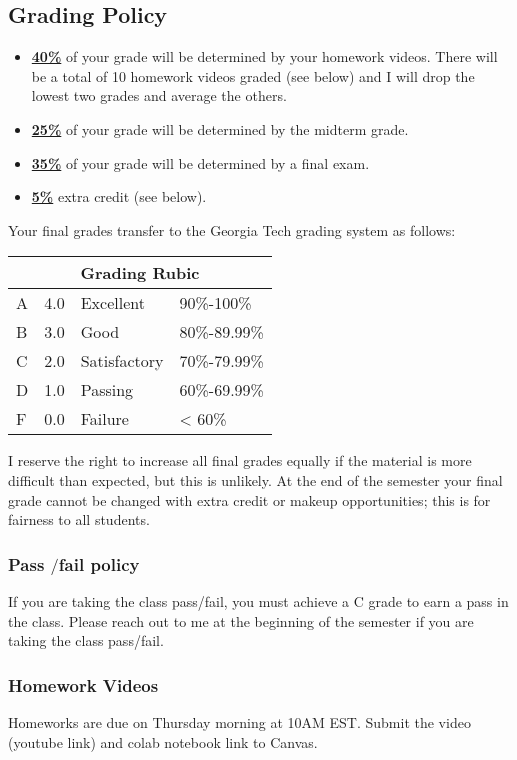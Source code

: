 \documentclass[11pt]{article}
\begin{document}
\subsection*{Grading Policy}
\begin{itemize}
\item \underline{\textbf{40\%}} of your grade will be determined by your homework videos. There will be a total of 10 homework videos graded (see below) and I will drop the lowest two grades and average the others. 
\item \underline{\textbf{25\%}} of your grade will be determined by the midterm grade. 
\item \underline{\textbf{35\%}} of your grade will be determined by a final exam.
\item \underline{\textbf{5\%}} extra credit (see below). 
\end{itemize}


Your final grades transfer to the Georgia Tech
grading system as follows:

\begin{tabular}{ |p{3cm}||p{3cm}|p{3cm}|p{3cm}|  }
  \hline
  \multicolumn{4}{|c|}{Grading Rubic} \\
  \hline
 A & 4.0 &Excellent&90\%-100\%\\
  \hline
  B   & 3.0    &Good&   80\%-89.99\%\\
  \hline
C&  2.0 & Satisfactory   &70\%-79.99\%\\
\hline
D&1.0 & Passing&  60\%-69.99\%\\
\hline
  F    &0.0 & Failure& < 60\%\\
  \hline
 \end{tabular}

 I  reserve   the   right   to   increase   all   final   grades   equally   if   the   material   is   more   difficult   than
 expected, but this is unlikely.   At the end of the semester your final grade cannot be changed
 with extra credit or makeup opportunities; this is for fairness to all students.
 \subsubsection*{Pass $/$fail policy}
 If you are taking the class pass/fail, you must achieve a C grade to earn a pass in the class.
 Please reach out to me at the beginning of the semester if you are taking the class pass/fail.


\subsubsection*{Homework Videos}
Homeworks are due on Thursday morning at 10AM EST. Submit the video (youtube link) and colab notebook link to Canvas. 
\end{document}
